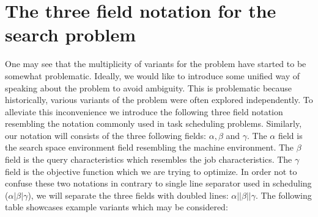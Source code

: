 \section{The three field notation for the search problem}
One may see that the multiplicity of variants for the problem have started to be somewhat problematic. Ideally, we would like to introduce some unified way of speaking about the problem to avoid ambiguity. This is problematic because historically, various variants of the problem were often explored independently. To alleviate this inconvenience we introduce the following three field notation resembling the notation commonly used in task scheduling problems. Similarly, our notation will consists of the three following fields: $\alpha, \beta$ and $\gamma$. The $\alpha$ field is the search space environment field resembling the machine environment. The $\beta$ field is the query characteristics which resembles the job characteristics. The $\gamma$ field is the objective function which we are trying to optimize. In order not to confuse these two notations in contrary to single line separator used in scheduling ($\alpha|\beta|\gamma$), we will separate the three fields with doubled lines: $\alpha||\beta||\gamma$. The following table showcases example variants which may be considered:


